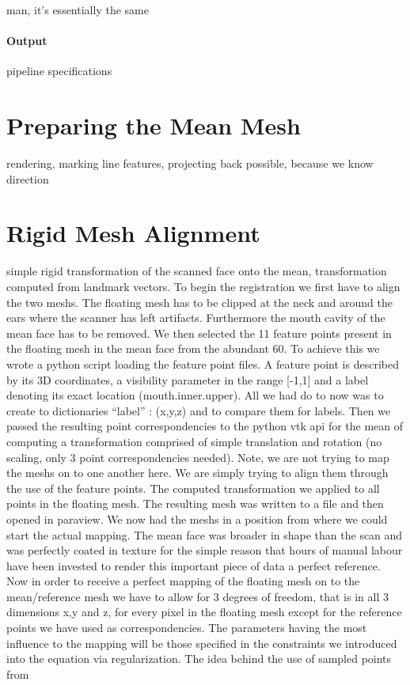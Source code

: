 man, it's essentially the same

\paragraph{Output}
pipeline specifications

\section{Preparing the Mean Mesh}
rendering, marking line features, projecting back possible, because we know direction

\section{Rigid Mesh Alignment}
simple rigid transformation of the scanned face onto the mean, transformation computed from landmark vectors.
To begin the registration we first have to align the two meshs. The floating mesh has to be clipped at the neck and around the ears where the scanner has left artifacts. Furthermore the mouth cavity of the mean face has to be removed. We then selected the 11 feature points present in the floating mesh in the mean face from the abundant 60. To achieve this we wrote a python script loading the feature point files. A feature point is described by its 3D coordinates, a visibility parameter
in the range [-1,1] and a label denoting its exact location (mouth.inner.upper). All we had do to now was to create to dictionaries “label” : (x,y,z) and to compare them for labels. Then we passed the resulting point correspondencies to the python vtk api for the mean of computing a transformation comprised of simple translation and rotation (no scaling, only 3 point correspondencies needed). Note, we are not trying to map the meshs on to one another here. We are simply trying to
align them through the use of the feature points. The computed transformation we applied to all points in the floating mesh. The resulting mesh was written to a file and then opened in paraview. We now had the meshs in a position from where we could start the actual mapping. The mean face was broader in shape than the scan and was perfectly coated in texture for the simple reason that hours of manual labour have been invested to render this important piece of data a perfect
reference.
Now in order to receive a perfect mapping of the floating mesh on to the mean/reference mesh we have to allow for 3 degrees of freedom, that is in all 3 dimensions x,y and z, for every pixel in the floating mesh except for the reference points we have used as correspondencies. The parameters having the most influence to the mapping will be those specified in the constraints we introduced into the equation via regularization. The idea behind the use of sampled points from
